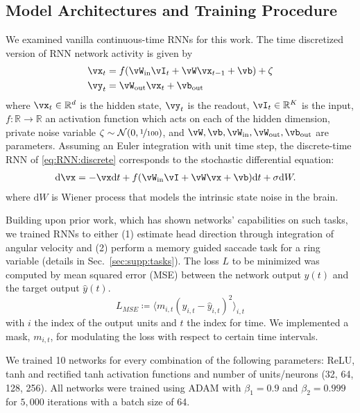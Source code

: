 \documentclass{article} %
\newcounter{ct}
\newcommand{\dm}[1]{\ensuremath{\mathrm{d}{#1}}} %
\newcommand{\win}{\vW_{\text{in}}}
\newcommand{\wout}{\vW_{\text{out}}}
\newcommand{\bout}{\vb_{\text{out}}}
\newcommand{\reals}{\mathbb{R}}
\theoremstyle{definition}
\theoremstyle{remark}
\begin{document}
\subsection{Model Architectures and Training Procedure}
We examined vanilla continuous-time RNNs for this work.
The time discretized version of RNN network activity is given by
\begin{equation}
  \begin{aligned}
	\vx_t &= f(\win \vI_t + \vW \vx_{t-1} + \vb) + \zeta \label{eq:RNN:discrete}\\
	\vy_t &= \wout \vx_t + \bout
  \end{aligned}
\end{equation}
where $\vx_t \in \reals^d$ is the hidden state, 
$\vy_t $ is the readout, 
$\vI_t \in \reals^K$ is the input,
$f\colon \reals \to \reals$ an activation function which acts on each of the hidden dimension, 
private noise variable $\zeta\sim\mathcal{N}(0,\nicefrac{1}{100})$, and %
$\vW, \vb, \win, \wout, \bout$ are parameters.
Assuming an Euler integration with unit time step, the discrete-time RNN of \eqref{eq:RNN:discrete} corresponds to the stochastic differential equation:
\begin{align}
    \dm{\vx} &= -\vx\dm{t} + f(\win \vI + \vW \vx + \vb)\dm{t} + \sigma \dm{W}. \label{eq:RNN:continuous}
\end{align}
where $\dm{W}$ is Wiener process that models the intrinsic state noise in the brain.

Building upon prior work, which has shown networks' capabilities on such tasks, we trained RNNs to either
(1) estimate head direction through integration of angular velocity \citep{cueva2019headdirection, cueva2021continuous}
and (2) perform a memory guided saccade task for a ring variable \citep{wimmer2014} (details in Sec.~\ref{sec:supp:tasks}).
The loss $L$ to be minimized was computed by mean squared error (MSE) between the network output $y(t)$ and the target output $\hat y(t)$.
\begin{equation}\label{eq:loss}
L_{MSE} \coloneqq \langle m_{i,t}(y_{i,t}-\hat y_{i,t})^2\rangle_{i,t}
\end{equation}
with $i$ the index of the output units and $t$  the index for time.
We implemented a mask, $m_{i,t}$, for modulating the loss with respect to certain time intervals.


We trained 10 networks for every combination of the following parameters:
 ReLU, tanh and rectified tanh activation functions and
 number of units/neurons (32, 64, 128, 256).
%
All networks were trained using ADAM with $\beta_1=0.9$ and $\beta_2=0.999$ for $5,000$ iterations with a batch size of 64.  %
\end{document}
